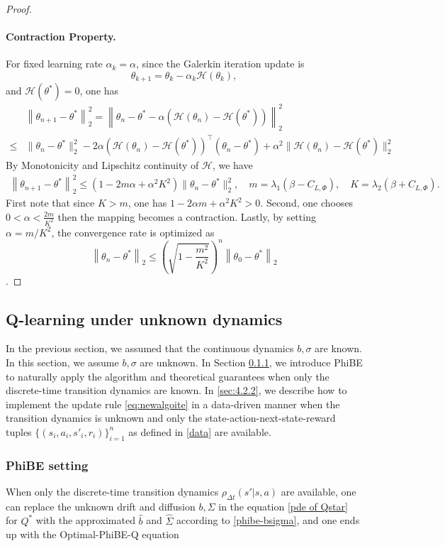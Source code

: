 \documentclass[12pt]{article}
\def\lam{\lambda}
\def\th{\theta}
\def\th{\theta}
\def\l{\left}
\def\r{\right}
\def\ll{\left\lVert}
\def\rl{\right\rVert}
\begin{document}
\begin{proof}
\paragraph{Contraction Property.}
For fixed learning rate $\alpha_k = \alpha$, since the Galerkin iteration update is
\[
\theta_{k+1} = \theta_k - \alpha_k \mathcal{H}(\theta_k),
\]
and $\mathcal{H}(\th^*) = 0$, one has
\[
\begin{aligned}
&\ll \th_{n+1} - \th^* \rl_2^2 = \ll \th_n -\th^* - \alpha (\mathcal{H}(\th_n) -  \mathcal{H}(\th^*)) \rl_2^2 \\
\leq&     \|\theta_n - \th^*\|_2^2 - 2\alpha  (\mathcal{H}(\theta_n) - \mathcal{H}(\th^*))^\top (\theta_n - \th^*)+ \alpha^2 \|\mathcal{H}(\theta_n) - \mathcal{H}(\th^*)\|_2^2
\end{aligned}
\]
By Monotonicity and Lipschitz continuity of $\mathcal H$, we have
\begin{align*}
\ll \th_{n+1} - \th^* \rl_2^2\leq (1 - 2m\alpha + \alpha^2 K^2) \|\theta_n - \th^*\|_2^2,\quad m = \lam_1(\beta - C_{L,\Phi}), \quad K = \lam_2(\beta + C_{L,\Phi}).
\end{align*}
First note that since $K>m$, one has $1 - 2\alpha m+ \alpha^2 K^2 > 0$. Second, one chooses $0< \alpha < \frac{2m}{K^2}$ then the mapping becomes a contraction. Lastly, by setting $\alpha = m/K^2$, the convergence rate is optimized as 
\[
\ll \th_n - \th^* \rl_2 \leq \l(\sqrt{1-\frac{m^2}{K^2}}\r)^n \ll\th_0 - \th^* \rl_2 
\]. 
\end{proof}




\subsection{Q-learning under unknown dynamics}\label{sec:off-policy-phibe}
In the previous section, we assumed that the continuous dynamics $b, \sigma$ are known. In this section, we assume $b, \sigma$ are unknown. In Section \ref{sec:4.2.1}, we introduce PhiBE to naturally apply the algorithm and theoretical guarantees when only the discrete-time transition dynamics are known. In \ref{sec:4.2.2}, we describe how to implement the update rule \eqref{eq:newalgoite} in a data-driven manner when the transition dynamics is unknown and only the state-action-next-state-reward tuples  $\{(s_i, a_i,s'_i,r_i)\}_{i=1}^n$ as defined in \eqref{data} are available.

\subsubsection{PhiBE setting}\label{sec:4.2.1}
When only the discrete-time transition dynamics $\rho_{\Delta t}(s'|s, a)$ are available, one can replace the unknown drift and diffusion $b,\Sigma$ in the equation \eqref{pde of Qstar} for $Q^*$ with the approximated $\hat{b}$ and $\hat{\Sigma}$ according to \eqref{phibe-bsigma}, and one ends up with the Optimal-PhiBE-Q equation
\end{document}
